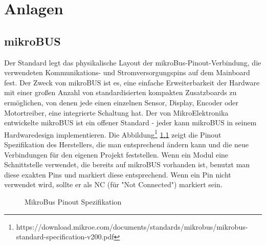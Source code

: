 \appendix
\chapter{Anlagen}

\section{mikroBUS}
\label{sec:appendix:microbus}
Der Standard legt das physikalische Layout der mikroBus-Pinout-Verbindung, die verwendeten Kommunikations- und Stromversorgungspins auf dem Mainboard fest. Der Zweck von mikroBUS ist es, eine einfache Erweiterbarkeit der Hardware mit einer großen Anzahl von standardisierten kompakten Zusatzboards zu ermöglichen, von denen jede einen einzelnen Sensor, Display, Encoder oder Motortreiber, eine integrierte Schaltung hat. Der von MikroElektronika entwickelte mikroBUS ist ein offener Standard - jeder kann mikroBUS in seinem Hardwaredesign implementieren. Die Abbildung\footnote{https://download.mikroe.com/documents/standards/mikrobus/mikrobus-standard-specification-v200.pdf} \ref{fig:mikrobus} zeigt die Pinout Spezifikation des Herstellers, die man entsprechend ändern kann und die neue Verbindungen für den eigenen Projekt feststellen. Wenn ein Modul eine Schnittstelle verwendet, die bereits auf mikroBUS vorhanden ist, benutzt man diese exakten Pins und markiert diese entsprechend. Wenn ein Pin nicht verwendet wird, sollte er als NC (für "Not Connected") markiert sein. 
\begin{figure}[!htb]
	\centering
	\caption{MikroBus Pinout Spezifikation}
	\label{fig:mikrobus}
\end{figure}

